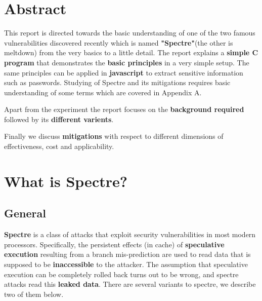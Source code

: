 \documentclass[12pt]{article}
\begin{document}

\tableofcontents
\pagebreak


\section{Abstract}
This report is directed towards the basic understanding of one of the two famous vulnerabilities discovered recently which is named \textbf{"Spectre"}(the other is meltdown) from the very basics to a little detail. The report explains a \textbf{simple C program} that demonstrates the \textbf{basic principles} in a very simple setup. The same principles can be applied in \textbf{javascript} to extract sensitive information such as passwords. Studying of Spectre and its mitigations requires basic understanding of some terms which are covered in Appendix A.

Apart from the experiment the report focuses on the \textbf{background required} followed by its \textbf{different varients}.

Finally we discuss \textbf{mitigations} with respect to different dimensions of effectiveness, cost and applicability.
%
%
\section{What is Spectre?}
\subsection{General}
    \textbf{Spectre} is a class of attacks that exploit security vulnerabilities in most modern processors. Specifically, the persistent effects (in cache) of \textbf{speculative execution} resulting from a branch mis-prediction are used to read data that is supposed to be \textbf{inaccessible} to the attacker. The assumption that speculative execution can be completely rolled back turns out to be wrong, and spectre attacks read this \textbf{leaked data}. There are several variants to spectre, we describe two of them below.
\end{document}
